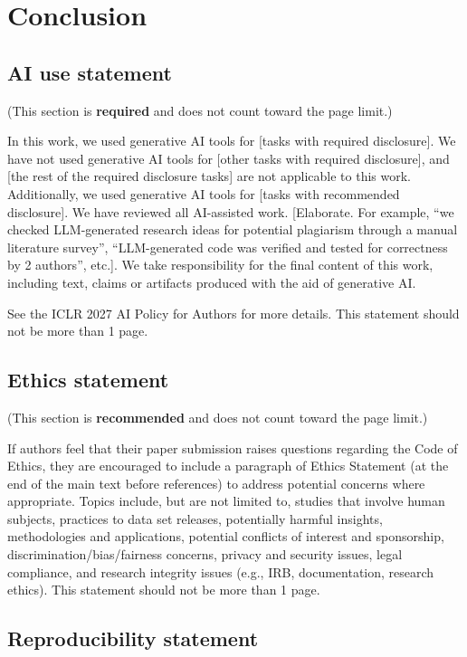 \documentclass{article} %
\begin{document}
\section{Conclusion}
\label{sec:conclusion}

\subsection*{AI use statement}

(This section is \textbf{required} and does not count toward the page limit.)

In this work, we used generative AI tools for [tasks with required disclosure].
We have not used generative AI tools for [other tasks with required disclosure],
and [the rest of the required disclosure tasks] are not applicable to this work.
Additionally, we used generative AI tools for [tasks with recommended
disclosure]. We have reviewed all AI-assisted work. [Elaborate. For example, “we
checked LLM-generated research ideas for potential plagiarism through a manual
literature survey”, “LLM-generated code was verified and tested for correctness
by 2 authors”, etc.]. We take responsibility for the final content of this work,
including text, claims or artifacts produced with the aid of generative AI.

See the ICLR 2027 AI Policy for Authors for more details. This statement should
not be more than 1 page.

\subsection*{Ethics statement}

(This section is \textbf{recommended} and does not count toward the page limit.)

If authors feel that their paper submission raises questions regarding the Code
of Ethics, they are encouraged to include a paragraph of Ethics Statement (at
the end of the main text before references) to address potential concerns where
appropriate. Topics include, but are not limited to, studies that involve human
subjects, practices to data set releases, potentially harmful insights,
methodologies and applications, potential conflicts of interest and sponsorship,
discrimination/bias/fairness concerns, privacy and security issues, legal
compliance, and research integrity issues (e.g., IRB, documentation, research
ethics). This statement should not be more than 1 page.

\subsection*{Reproducibility statement}
\end{document}
